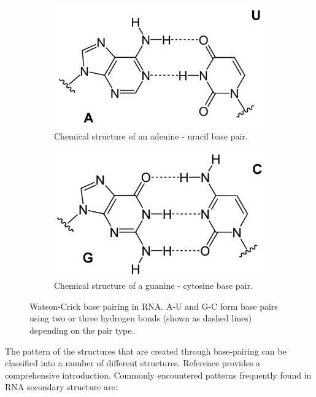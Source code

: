 \documentclass[journal]{IEEEtran}
\begin{document}
 \begin{figure}[!tbp]
  \begin{subfigure}[b]{0.5\textwidth}
    \includegraphics[width=\textwidth]{img/Base_pair_AU.png}
    \caption{Chemical structure of an adenine - uracil base pair.}
    \label{fig:au-base-pair}
  \end{subfigure}
  \hfill
  \begin{subfigure}[b]{0.5\textwidth}
    \includegraphics[width=\textwidth]{img/Base_pair_GC.png}
    \caption{Chemical structure of a guanine - cytosine base pair.}
    \label{fig:gc-base-pair}
  \end{subfigure}
  \caption{Watson-Crick base pairing in RNA. A-U and G-C form base pairs using two or three hydrogen bonds (shown as dashed lines) depending on the pair type.}
\end{figure}

The pattern of the structures that are created through base-pairing can be classified into a number of different structures. Reference \cite{nowakowski1997rna} provides a comprehensive introduction. Commonly encountered patterns frequently found in RNA secondary structure are:
\end{document}
